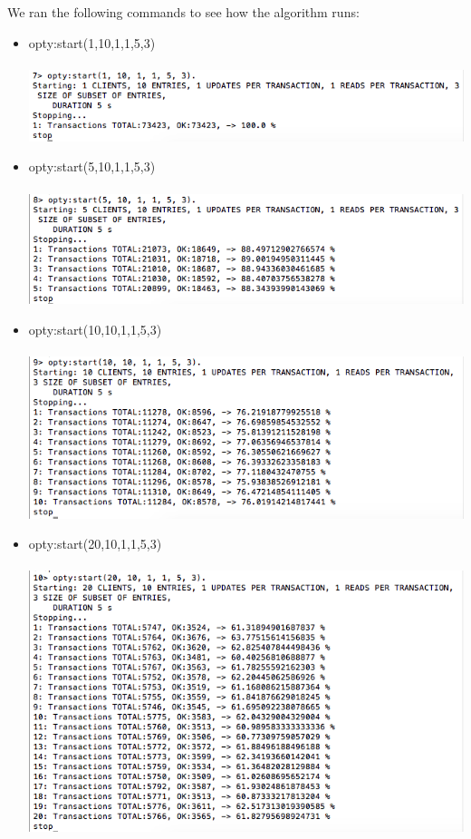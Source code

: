 \documentclass[a4paper, 11pt]{article}
\begin{document}
We ran the following commands to see how the algorithm runs:
\begin{itemize}
\item opty:start(1,10,1,1,5,3)\\\\
\includegraphics[scale=0.5]{images/exp-i-1.png} \\
\item opty:start(5,10,1,1,5,3)\\\\
\includegraphics[scale=0.5]{images/exp-i-2.png} \\
\newpage
\item opty:start(10,10,1,1,5,3)\\\\
\includegraphics[scale=0.5]{images/exp-i-3.png} \\
\item opty:start(20,10,1,1,5,3)\\\\
\includegraphics[scale=0.5]{images/exp-i-4.png} \\

\end{itemize}
\end{document}

